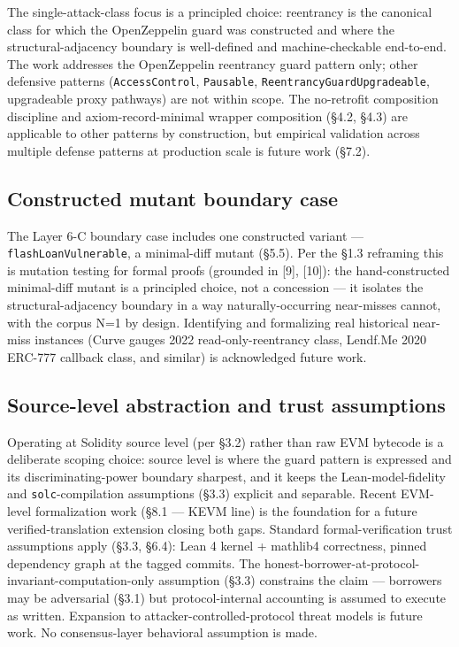 The single-attack-class focus is a principled choice: reentrancy is the
canonical class for which the OpenZeppelin guard was constructed and
where the structural-adjacency boundary is well-defined and
machine-checkable end-to-end. The work addresses the OpenZeppelin
reentrancy guard pattern only; other defensive patterns
(\texttt{AccessControl}, \texttt{Pausable},
\texttt{ReentrancyGuardUpgradeable}, upgradeable proxy pathways) are not
within scope. The no-retrofit composition discipline and
axiom-record-minimal wrapper composition (§4.2, §4.3) are applicable to
other patterns by construction, but empirical validation across multiple
defense patterns at production scale is future work (§7.2).

\subsection{Constructed mutant boundary
case}\label{constructed-mutant-boundary-case}

The Layer 6-C boundary case includes one constructed variant ---
\texttt{flashLoanVulnerable}, a minimal-diff mutant (§5.5). Per the §1.3
reframing this is mutation testing for formal proofs (grounded in
{[}9{]}, {[}10{]}): the hand-constructed minimal-diff mutant is a
principled choice, not a concession --- it isolates the
structural-adjacency boundary in a way naturally-occurring near-misses
cannot, with the corpus N=1 by design. Identifying and formalizing real
historical near-miss instances (Curve gauges 2022 read-only-reentrancy
class, Lendf.Me 2020 ERC-777 callback class, and similar) is
acknowledged future work.

\subsection{Source-level abstraction and trust
assumptions}\label{source-level-abstraction-and-trust-assumptions}

Operating at Solidity source level (per §3.2) rather than raw EVM
bytecode is a deliberate scoping choice: source level is where the guard
pattern is expressed and its discriminating-power boundary sharpest, and
it keeps the Lean-model-fidelity and \texttt{solc}-compilation
assumptions (§3.3) explicit and separable. Recent EVM-level
formalization work (§8.1 --- KEVM line) is the foundation for a future
verified-translation extension closing both gaps. Standard
formal-verification trust assumptions apply (§3.3, §6.4): Lean 4 kernel
+ mathlib4 correctness, pinned dependency graph at the tagged commits.
The honest-borrower-at-protocol-invariant-computation-only assumption
(§3.3) constrains the claim --- borrowers may be adversarial (§3.1) but
protocol-internal accounting is assumed to execute as written. Expansion
to attacker-controlled-protocol threat models is future work. No
consensus-layer behavioral assumption is made.

